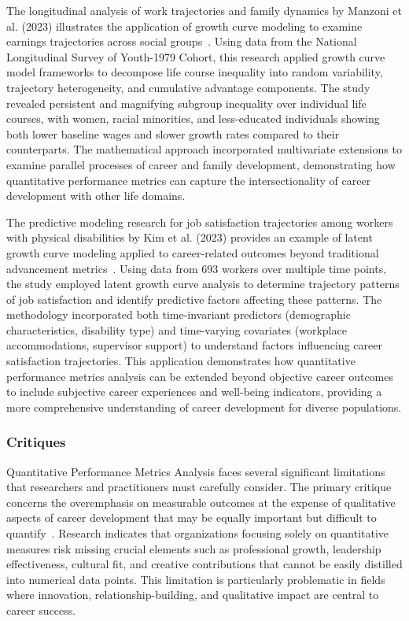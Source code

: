 \documentclass[main.tex]{subfiles}
\begin{document}
The longitudinal analysis of work trajectories and family dynamics by Manzoni et al. (2023) illustrates the application of growth curve modeling to examine earnings trajectories across social groups~\parencite{work_trajectories}. Using data from the National Longitudinal Survey of Youth-1979 Cohort, this research applied growth curve model frameworks to decompose life course inequality into random variability, trajectory heterogeneity, and cumulative advantage components. The study revealed persistent and magnifying subgroup inequality over individual life courses, with women, racial minorities, and less-educated individuals showing both lower baseline wages and slower growth rates compared to their counterparts. The mathematical approach incorporated multivariate extensions to examine parallel processes of career and family development, demonstrating how quantitative performance metrics can capture the intersectionality of career development with other life domains.

The predictive modeling research for job satisfaction trajectories among workers with physical disabilities by Kim et al. (2023) provides an example of latent growth curve modeling applied to career-related outcomes beyond traditional advancement metrics~\parencite{job_satisfaction}. Using data from 693 workers over multiple time points, the study employed latent growth curve analysis to determine trajectory patterns of job satisfaction and identify predictive factors affecting these patterns. The methodology incorporated both time-invariant predictors (demographic characteristics, disability type) and time-varying covariates (workplace accommodations, supervisor support) to understand factors influencing career satisfaction trajectories. This application demonstrates how quantitative performance metrics analysis can be extended beyond objective career outcomes to include subjective career experiences and well-being indicators, providing a more comprehensive understanding of career development for diverse populations.

\subsubsection{Critiques}

Quantitative Performance Metrics Analysis faces several significant limitations that researchers and practitioners must carefully consider. The primary critique concerns the overemphasis on measurable outcomes at the expense of qualitative aspects of career development that may be equally important but difficult to quantify~\parencite{beyond_numbers}. Research indicates that organizations focusing solely on quantitative measures risk missing crucial elements such as professional growth, leadership effectiveness, cultural fit, and creative contributions that cannot be easily distilled into numerical data points. This limitation is particularly problematic in fields where innovation, relationship-building, and qualitative impact are central to career success.
\end{document}

